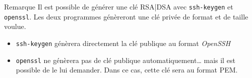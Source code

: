 \documentclass[a4paper,11pt]{article}
\begin{document}
\begin{coltbox}{Remarque}	
	Il est possible de générer une clé RSA|DSA avec \texttt{ssh-keygen} et
	\texttt{openssl}. Les deux programmes génèreront une clé privée de format et
	de taille voulue.

	\begin{itemize}
		\item \texttt{ssh-keygen} génèrera directement la clé publique au
			format \textit{OpenSSH}
		\item \texttt{openssl} ne génèrera pas de clé publique
			automatiquement… mais il est possible de le lui demander. Dans ce
			cas, cette clé sera au format PEM.
	\end{itemize}
\end{coltbox}
\vspace{1cm}
\end{document}

